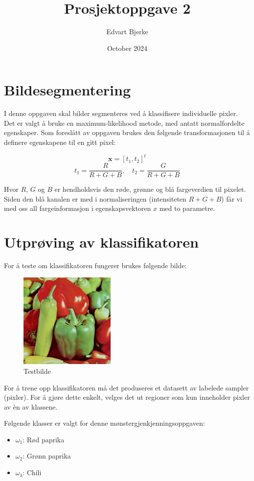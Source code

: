 \documentclass{article}
\title{Prosjektoppgave 2}
\author{Edvart Bjerke}
\date{October 2024}
\begin{document}
\graphicspath{ {./images/} }
\maketitle

\section{Bildesegmentering}
I denne oppgaven skal bilder segmenteres ved å klassifisere individuelle pixler.
Det er valgt å bruke en maximum-likelihood metode, med antatt normalfordelte egenskaper.
Som foreslått av oppgaven brukes den følgende transformasjonen til å definere egenskapene
til en gitt pixel:

\[\bm{x} = [t_1, t_2]^t\]
\[t_1 = \frac{R}{R+G+B}, \quad t_2 = \frac{G}{R+G+B}\]

Hvor $R$, $G$ og $B$ er hendholdsvis den røde, grønne og blå fargeverdien til pixelet.
Siden den blå kanalen er med i normaliseringen (intensiteten $R+G+B$) får vi med oss all fargeinformasjon
i egenskapsvektoren $x$ med to parametre.

\newpage
\section{Utprøving av klassifikatoren}
For å teste om klassifikatoren fungerer brukes følgende bilde:

\begin{figure}[h]
    \centering
    \includegraphics[width=4.7cm]{Bilde1}
    \caption{Testbilde}
\end{figure}

For å trene opp klassifikatoren må det produseres et datasett av labelede sampler (pixler).
For å gjøre dette enkelt, velges det ut regioner som kun inneholder pixler av èn av klassene.

Følgende klasser er valgt for denne mønstergjenkjenningsoppgaven:
\begin{itemize}
    \item[ ] $\omega_1$: Rød paprika
    \item[ ] $\omega_2$: Grønn paprika
    \item[ ] $\omega_3$: Chili
\end{itemize}
\end{document}
